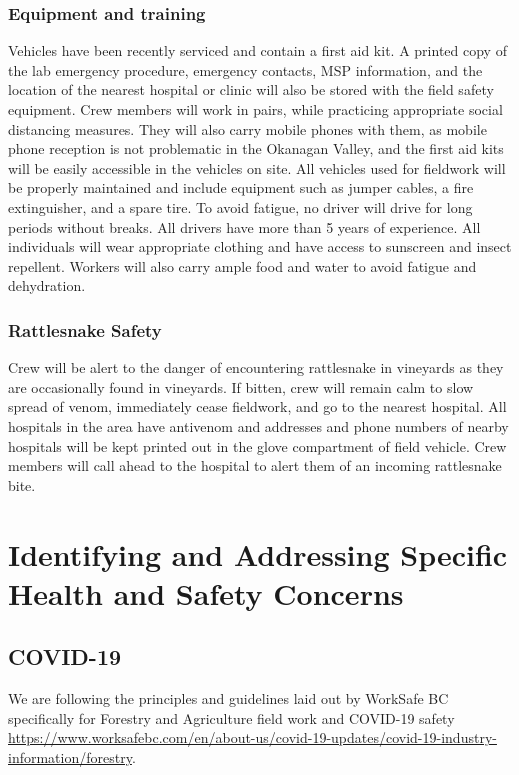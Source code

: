 \documentclass[11pt,letter]{article}
\begin{document}
\subsubsection{Equipment and training}
Vehicles have been recently serviced and contain a first aid kit. A printed copy of the lab emergency procedure, emergency contacts, MSP information, and the location of the nearest hospital or clinic will also be stored with the field safety equipment. Crew members will work in pairs, while practicing appropriate social distancing measures. They will also carry mobile phones with them, as mobile phone reception is not problematic in the Okanagan Valley, and the first aid kits will be easily accessible in the vehicles on site. All vehicles used for fieldwork will be properly maintained and include equipment such as jumper cables, a fire extinguisher, and a spare tire. To avoid fatigue, no driver will drive for long periods without breaks. All drivers have more than 5 years of experience. All individuals will wear appropriate clothing and have access to sunscreen and insect repellent. Workers will also carry ample food and water to avoid fatigue and dehydration.  

\subsubsection{Rattlesnake Safety}
Crew will be alert to the danger of encountering rattlesnake in vineyards as they are occasionally found in vineyards. If bitten, crew will remain calm to slow spread of venom, immediately cease fieldwork, and go to the nearest hospital. All hospitals in the area have antivenom and addresses and phone numbers of nearby hospitals will be kept printed out in the glove compartment of field vehicle. Crew members will call ahead to the hospital to alert them of an incoming rattlesnake bite.

\section{Identifying and Addressing Specific Health and Safety Concerns}

\subsection{COVID-19}

We are following the principles and guidelines laid out by WorkSafe BC specifically for Forestry and Agriculture field work and COVID-19 safety \url{https://www.worksafebc.com/en/about-us/covid-19-updates/covid-19-industry-information/forestry}. 
\end{document}
